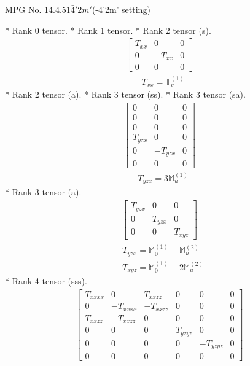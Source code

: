 \documentclass[fleqn,8pt,landscape]{jsarticle}
\begin{document}
\setcounter{MaxMatrixCols}{32}

\renewcommand{\tablename}{Table~}
\renewcommand{\figurename}{Figure~}
\begin{center}
\LARGE
MPG No. 14.4.51\quad$\bar{4}'2m'$\quad(-4'2m' setting)
\end{center}
* Rank 0 tensor.
* Rank 1 tensor.
* Rank 2 tensor (s).
\begin{align*}
\begin{bmatrix} T_{xx} & 0 & 0 \\ 0 & - T_{xx} & 0 \\ 0 & 0 & 0 \end{bmatrix}
\end{align*}
\begin{align*}
& T_{xx} = \mathbb{T}_{v}^{(1)}
\end{align*}
* Rank 2 tensor (a).
* Rank 3 tensor (ss).
* Rank 3 tensor (sa).
\begin{align*}
\begin{bmatrix} 0 & 0 & 0 \\ 0 & 0 & 0 \\ 0 & 0 & 0 \\ T_{yzx} & 0 & 0 \\ 0 & - T_{yzx} & 0 \\ 0 & 0 & 0 \end{bmatrix}
\end{align*}
\begin{align*}
& T_{yzx} = 3 \mathbb{M}_{u}^{(1)}
\end{align*}
* Rank 3 tensor (a).
\begin{align*}
\begin{bmatrix} T_{yzx} & 0 & 0 \\ 0 & T_{yzx} & 0 \\ 0 & 0 & T_{xyz} \end{bmatrix}
\end{align*}
\begin{align*}
& T_{yzx} = \mathbb{M}_{0}^{(1)} - \mathbb{M}_{u}^{(2)} \\
& T_{xyz} = \mathbb{M}_{0}^{(1)} + 2 \mathbb{M}_{u}^{(2)}
\end{align*}
* Rank 4 tensor (sss).
\begin{align*}
\begin{bmatrix} T_{xxxx} & 0 & T_{xxzz} & 0 & 0 & 0 \\ 0 & - T_{xxxx} & - T_{xxzz} & 0 & 0 & 0 \\ T_{xxzz} & - T_{xxzz} & 0 & 0 & 0 & 0 \\ 0 & 0 & 0 & T_{yzyz} & 0 & 0 \\ 0 & 0 & 0 & 0 & - T_{yzyz} & 0 \\ 0 & 0 & 0 & 0 & 0 & 0 \end{bmatrix}
\end{align*}
\end{document}
